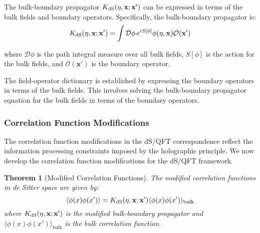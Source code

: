 \documentclass[11pt,english,twoside]{article}
\theoremstyle{plain}
\newtheorem{theorem}{Theorem}[section]
\theoremstyle{definition}
\theoremstyle{remark}
\newcommand{\dS}{{\rm dS}}
\newcommand{\xb}{\mathbf{x}}
\begin{document}
The bulk-boundary propagator $K_{\dS}(\eta,\xb;\xb')$ can be expressed in terms of the bulk fields and boundary operators. Specifically, the bulk-boundary propagator is:
\begin{equation}
K_{\dS}(\eta,\xb;\xb') = \int \mathcal{D}\phi \, e^{iS[\phi]} \phi(\eta,\xb) \mathcal{O}(\xb')
\end{equation}

where $\mathcal{D}\phi$ is the path integral measure over all bulk fields, $S[\phi]$ is the action for the bulk fields, and $\mathcal{O}(\xb')$ is the boundary operator.

The field-operator dictionary is established by expressing the boundary operators in terms of the bulk fields. This involves solving the bulk-boundary propagator equation for the bulk fields in terms of the boundary operators.

\subsubsection{Correlation Function Modifications}

The correlation function modifications in the dS/QFT correspondence reflect the information processing constraints imposed by the holographic principle. We now develop the correlation function modifications for the dS/QFT framework.

\begin{theorem}[Modified Correlation Functions]
\label{thm:modified_correlation}
The modified correlation functions in de Sitter space are given by:
\begin{equation}
\langle \phi(x) \phi(x') \rangle = K_{\dS}(\eta,\xb;\xb') \langle \phi(x) \phi(x') \rangle_{\text{bulk}}
\end{equation}
where $K_{\dS}(\eta,\xb;\xb')$ is the modified bulk-boundary propagator and $\langle \phi(x) \phi(x') \rangle_{\text{bulk}}$ is the bulk correlation function.
\end{theorem}
\end{document}
